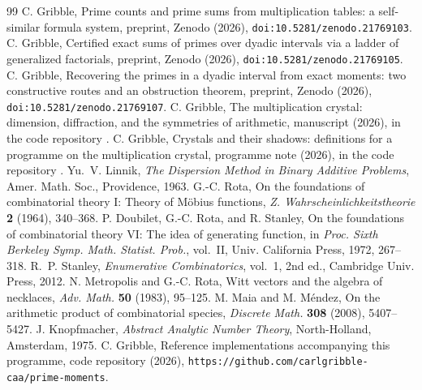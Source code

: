 \documentclass[11pt]{article}
\theoremstyle{remark}
\begin{document}
\begin{thebibliography}{99}
 C. Gribble, Prime counts and prime sums from multiplication tables: a
self-similar formula system, preprint, Zenodo (2026), \texttt{doi:10.5281/zenodo.21769103}.
 C. Gribble, Certified exact sums of primes over dyadic intervals via a
ladder of generalized factorials, preprint, Zenodo (2026), \texttt{doi:10.5281/zenodo.21769105}.
 C. Gribble, Recovering the primes in a dyadic interval from exact moments:
two constructive routes and an obstruction theorem, preprint, Zenodo (2026),
\texttt{doi:10.5281/zenodo.21769107}.
 C. Gribble, The multiplication crystal: dimension, diffraction, and the symmetries
of arithmetic, manuscript (2026), in the code repository \cite{Code}.
 C. Gribble, Crystals and their shadows: definitions for a programme on the
multiplication crystal, programme note (2026), in the code repository \cite{Code}.
 Yu.~V. Linnik, \emph{The Dispersion Method in Binary Additive Problems}, Amer.
Math. Soc., Providence, 1963.
 G.-C. Rota, On the foundations of combinatorial theory I: Theory of M\"obius
functions, \emph{Z. Wahrscheinlichkeitstheorie} \textbf{2} (1964), 340--368.
 P. Doubilet, G.-C. Rota, and R. Stanley, On the foundations of combinatorial theory
VI: The idea of generating function, in \emph{Proc. Sixth Berkeley Symp. Math. Statist. Prob.},
vol.~II, Univ. California Press, 1972, 267--318.
 R.~P. Stanley, \emph{Enumerative Combinatorics}, vol.~1, 2nd ed., Cambridge
Univ. Press, 2012.
 N. Metropolis and G.-C. Rota, Witt vectors and the algebra of necklaces,
\emph{Adv. Math.} \textbf{50} (1983), 95--125.
 M. Maia and M. M\'endez, On the arithmetic product of combinatorial species,
\emph{Discrete Math.} \textbf{308} (2008), 5407--5427.
 J. Knopfmacher, \emph{Abstract Analytic Number Theory}, North-Holland,
Amsterdam, 1975.
 C. Gribble, Reference implementations accompanying this programme, code repository
(2026), \texttt{https://github.com/carlgribble-caa/prime-moments}.
\end{thebibliography}
\end{document}
